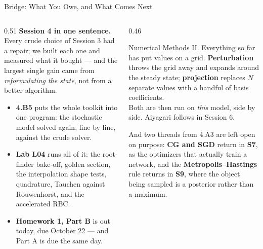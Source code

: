 \begin{frame}{Bridge: What You Owe, and What Comes Next}
\begin{columns}[T]
\begin{column}{0.51\textwidth}
\small
\textbf{Session 4 in one sentence.} Every crude choice of Session 3 had a repair; we built each one and measured what it bought --- and the largest single gain came from \emph{reformulating the state}, not from a better algorithm.
\medskip
\begin{itemize}\footnotesize
  \item \textbf{4.B5} puts the whole toolkit into one program: the stochastic model solved again, line by line, against the crude solver.
  \item \textbf{Lab L04} runs all of it: the root-finder bake-off, golden section, the interpolation shape tests, quadrature, Tauchen against Rouwenhorst, and the accelerated RBC.
  \item \textbf{Homework 1, Part B} is out today, due October 22 --- and Part A is due the same day.
\end{itemize}
\end{column}
\begin{column}{0.46\textwidth}
\begin{conceptbox}[title=\textbf{Next week (S5)}]\small
Numerical Methods II. Everything so far has put values on a grid. \textbf{Perturbation} throws the grid away and expands around the steady state; \textbf{projection} replaces $N$ separate values with a handful of basis coefficients.\\[1mm]
Both are then run on \emph{this} model, side by side. Aiyagari follows in Session 6.
\end{conceptbox}
\vspace{-1mm}
\begin{examplebox}\footnotesize
And two threads from 4.A3 are left open on purpose: \textbf{CG and SGD} return in \textbf{S7}, as the optimizers that actually train a network, and the \textbf{Metropolis--Hastings} rule returns in \textbf{S9}, where the object being sampled is a posterior rather than a maximum.
\end{examplebox}
\end{column}
\end{columns}
\end{frame}


